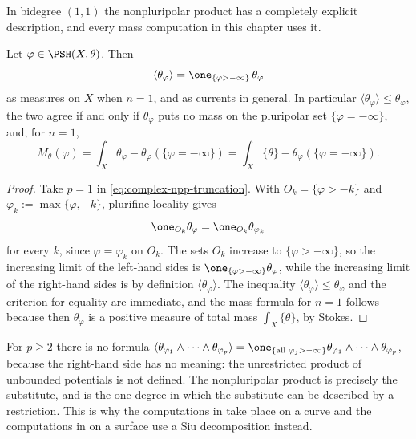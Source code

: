 In bidegree \((1,1)\) the nonpluripolar product has a completely explicit
description, and every mass computation in this chapter uses it.

\begin{lemma}\label{lem:ch51-npp-bidegree-one}
Let \(\varphi\in\PSH(X,\theta)\).  Then
\[
 \langle\theta_\varphi\rangle
 =\one_{\{\varphi>-\infty\}}\,\theta_\varphi
\]
as measures on \(X\) when \(n=1\), and as currents in general.  In
particular \(\langle\theta_\varphi\rangle\leq\theta_\varphi\), the two
agree if and only if \(\theta_\varphi\) puts no mass on the pluripolar
set \(\{\varphi=-\infty\}\), and, for \(n=1\),
\[
 M_\theta(\varphi)
 =\int_X\theta_\varphi-\theta_\varphi(\{\varphi=-\infty\})
 =\int_X\{\theta\}-\theta_\varphi(\{\varphi=-\infty\}).
\]
\end{lemma}

\begin{proof}
Take \(p=1\) in \eqref{eq:complex-npp-truncation}.  With
\(O_k=\{\varphi>-k\}\) and \(\varphi_k:=\max\{\varphi,-k\}\), plurifine
locality gives
\[
 \one_{O_k}\theta_\varphi=\one_{O_k}\theta_{\varphi_k}
\]
for every \(k\), since \(\varphi=\varphi_k\) on \(O_k\).  The sets
\(O_k\) increase to \(\{\varphi>-\infty\}\), so the increasing limit of
the left-hand sides is \(\one_{\{\varphi>-\infty\}}\theta_\varphi\), while
the increasing limit of the right-hand sides is by definition
\(\langle\theta_\varphi\rangle\).  The inequality
\(\langle\theta_\varphi\rangle\leq\theta_\varphi\) and the criterion for
equality are immediate, and the mass formula for \(n=1\) follows because
then \(\theta_\varphi\) is a positive measure of total mass
\(\int_X\{\theta\}\), by Stokes.
\end{proof}

\begin{remark}
\label{rem:ch51-npp-no-restriction}
For \(p\geq2\) there is no formula
\(\langle\theta_{\varphi_1}\wedge\cdots\wedge\theta_{\varphi_p}\rangle
=\one_{\{\text{all }\varphi_j>-\infty\}}
\theta_{\varphi_1}\wedge\cdots\wedge\theta_{\varphi_p}\), because the
right-hand side has no meaning: the unrestricted product of unbounded
potentials is not defined.  The nonpluripolar product is precisely the
substitute, and  is the one degree in
which the substitute can be described by a restriction.  This is why the
computations in  take place on a curve and the
computations in  on a surface use a Siu
decomposition instead.
\end{remark}

